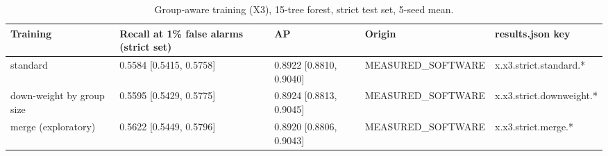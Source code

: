 \begin{table}[t]
\centering
\small
\caption{Group-aware training (X3), 15-tree forest, strict test set, 5-seed mean.}
\label{tab:jp_tab_x3}
\begin{tabular}{lllll}
\toprule
Training & Recall at 1\% false alarms (strict set) & AP & Origin & results.json key \\
\midrule
standard & 0.5584 [0.5415, 0.5758] & 0.8922 [0.8810, 0.9040] & MEASURED\_SOFTWARE & x.x3.strict.standard.* \\
down-weight by group size & 0.5595 [0.5429, 0.5775] & 0.8924 [0.8813, 0.9045] & MEASURED\_SOFTWARE & x.x3.strict.downweight.* \\
merge (exploratory) & 0.5622 [0.5449, 0.5796] & 0.8920 [0.8806, 0.9043] & MEASURED\_SOFTWARE & x.x3.strict.merge.* \\
\bottomrule
\end{tabular}
\end{table}
